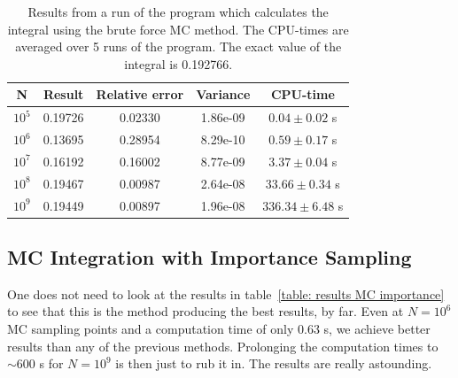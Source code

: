 \documentclass[twoside, 11pt]{article}
\begin{document}
		\begin{table}[h]
			\centering
			\caption{Results from a run of the program which calculates the integral using the brute force MC method. The CPU-times are averaged over 5 runs of the program. The exact value of the integral is 0.192766.}
			\label{table: results brute force MC}
			\begin{tabular}{|c|c|c|c|c|}
\hline
\textbf{N} 		&	\textbf{Result}		&	\textbf{Relative error}	&	\textbf{Variance}	&	\textbf{CPU-time} \\ \hline
$10^5$ 	&	0.19726	&	0.02330	&	1.86e-09	&	$0.04 \pm 0.02$ s	\\ \hline 
$10^6$ 	&	0.13695	&	0.28954	&	8.29e-10	&	$0.59 \pm 0.17$ s	\\ \hline 
$10^7$ 	&	0.16192	&	0.16002	&	8.77e-09	&	$3.37 \pm 0.04$ s	\\ \hline 
$10^8$ 	&	0.19467	&	0.00987	&	2.64e-08	&	$33.66 \pm 0.34$ s	\\ \hline 
$10^9$ 	&	0.19449	&	0.00897	&	1.96e-08	&	$336.34 \pm 6.48$ s	\\ \hline 
			\end{tabular}
		\end{table}
	
	\subsection{MC Integration with Importance Sampling}
		One does not need to look at the results in table~\ref{table: results MC importance} to see that this is the method producing the best results, by far. Even at $N=10^6$ MC sampling points and a computation time of only 0.63 s, we achieve better results than any of the previous methods. Prolonging the computation times to $\sim 600$ s for $N=10^9$ is then just to rub it in. The results are really astounding. 
		
\end{document}
